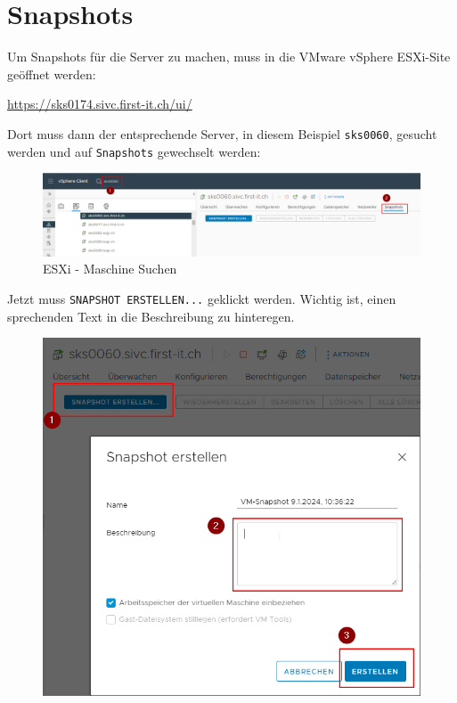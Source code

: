 
\chapter{Snapshots}
{
    \begin{flushleft}
        Um Snapshots für die Server zu machen, muss in die \Gls{VMware vSphere} ESXi-Site geöffnet werden:
    \end{flushleft}
    \begin{flushleft}
        \url{https://sks0174.sivc.first-it.ch/ui/}
    \end{flushleft}
    \begin{flushleft}
        Dort muss dann der entsprechende Server, in diesem Beispiel \texttt{sks0060}, gesucht werden und auf \texttt{Snapshots} gewechselt werden:
        \begin{figure}[H]
            \centering
            \includegraphics[width=1\linewidth]{source/snapshots/esxi_select_machine}
            \caption{ESXi - Maschine Suchen}
            \label{fig:esxi_select_machine}
        \end{figure}
    \end{flushleft}
    \begin{flushleft}
        Jetzt muss \texttt{SNAPSHOT ERSTELLEN...} geklickt werden.
        Wichtig ist, einen sprechenden Text in die Beschreibung zu hinteregen.
        \begin{figure}[H]
            \centering
            \includegraphics[width=0.5\linewidth]{source/snapshots/esxi_set_snapshot}

\end{figure}
\end{flushleft}}
